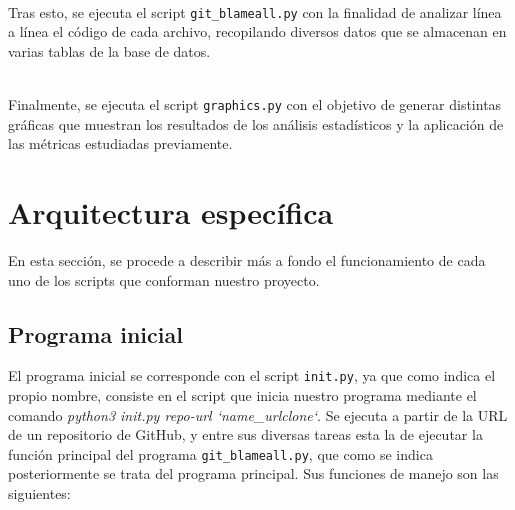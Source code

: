 \documentclass[a4paper, 12pt]{book}
\begin{document}
\\Tras esto, se ejecuta el script \texttt{git\_blameall.py} con la finalidad de analizar línea a línea el código de cada archivo, recopilando diversos datos que se almacenan en varias tablas de la base de datos.

\\Finalmente, se ejecuta el script \texttt{graphics.py} con el objetivo de generar distintas gráficas que muestran los resultados de los análisis estadísticos y la aplicación de las métricas estudiadas previamente.

\section{Arquitectura específica} 
\label{sec:arquitectura-especifica}

En esta sección, se procede a describir más a fondo el funcionamiento de cada uno de los scripts que conforman nuestro proyecto.

\subsection{Programa inicial}
\label{subsec:programa-inicial}

El programa inicial se corresponde con el script \texttt{init.py}, ya que como indica el propio nombre, consiste en el script que inicia nuestro programa mediante el comando \textit{python3 init.py repo-url `name\_urlclone`}.
Se ejecuta a partir de la URL de un repositorio de GitHub, y entre sus diversas tareas esta la de ejecutar la función principal del programa \texttt{git\_blameall.py}, que como se indica posteriormente se trata del
programa principal. Sus funciones de manejo son las siguientes:
\end{document}
